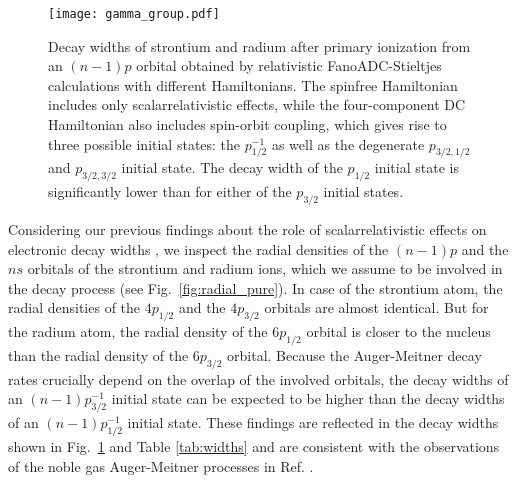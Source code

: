 \documentclass[aps,amssymb,preprint,a4paper,longbibliography]{revtex4}
\begin{document}
\begin{figure}[h]
 \centering
 \texttt{[image: gamma\_group.pdf]}
 \caption{Decay widths of strontium and radium after primary ionization from
          an $(n-1)p$ orbital obtained by relativistic FanoADC-Stieltjes
          calculations with different Hamiltonians. The spinfree Hamiltonian
          includes only scalarrelativistic effects, while the four-component
          DC Hamiltonian also includes spin-orbit coupling, which gives rise to
          three possible initial states: the $p_{1/2}^{-1}$ as well as the
          degenerate $p_{3/2,1/2}$ and $p_{3/2,3/2}$ initial state.
          The decay width of the $p_{1/2}$
          initial state is significantly lower than for either of the
          $p_{3/2}$ initial
          states.}
 \label{fig:gamma}
\end{figure}

Considering our previous findings about the role
of scalarrelativistic effects on electronic decay widths \cite{Fasshauer15_1},
we inspect the radial densities of the $(n-1)p$ and the $ns$ orbitals of the
strontium and radium ions,
which we assume to be involved in the decay process (see
Fig.~\ref{fig:radial_pure}).
In case of the strontium atom, the radial densities of the $4p_{1/2}$ and the
$4p_{3/2}$ orbitals are almost identical. But for the radium atom, the radial
density of the  $6p_{1/2}$ orbital is closer to the nucleus than
the radial density of the $6p_{3/2}$ orbital.
Because the Auger-Meitner decay rates crucially depend on the overlap of the
involved orbitals, the decay widths of an $(n-1)p_{3/2}^{-1}$ initial state
can be expected to be higher than the decay widths of an $(n-1)p_{1/2}^{-1}$
initial state. These findings are reflected in the decay widths shown in
Fig.~\ref{fig:gamma} and Table \ref{tab:widths} and are consistent with the
observations of the noble gas Auger-Meitner processes in Ref. \cite{Fasshauer15_1}.
\end{document}
